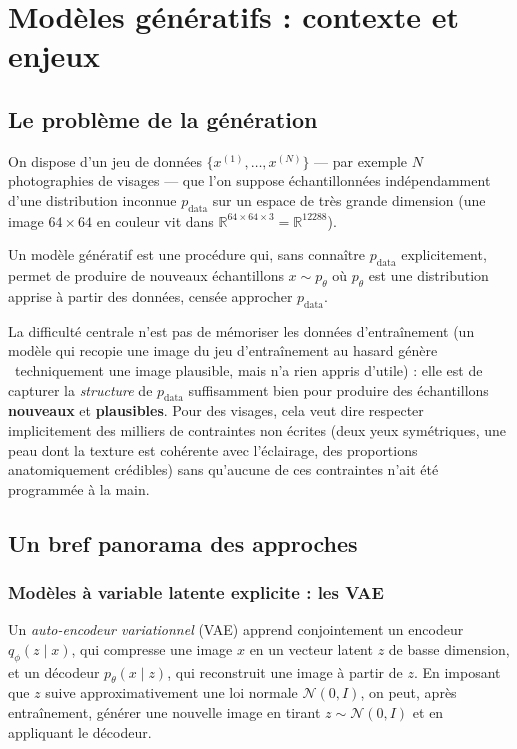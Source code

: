 \chapter{Modèles génératifs : contexte et enjeux}
\label{chap:generative}

\section{Le problème de la génération}

On dispose d'un jeu de données $\{x^{(1)}, \dots, x^{(N)}\}$ — par exemple $N$ photographies de
visages — que l'on suppose échantillonnées indépendamment d'une distribution inconnue $p_{\text{data}}$
sur un espace de très grande dimension (une image $64\times 64$ en couleur vit dans
$\mathbb{R}^{64 \times 64 \times 3} = \mathbb{R}^{12288}$).

\begin{definition}
Un modèle génératif est une procédure qui, sans connaître $p_{\text{data}}$ explicitement, permet de
produire de nouveaux échantillons $x \sim p_\theta$ où $p_\theta$ est une distribution apprise à
partir des données, censée approcher $p_{\text{data}}$.
\end{definition}

La difficulté centrale n'est pas de mémoriser les données d'entraînement (un modèle qui recopie une
image du jeu d'entraînement au hasard \og génère \fg\ techniquement une image plausible, mais n'a rien
appris d'utile) : elle est de capturer la \emph{structure} de $p_{\text{data}}$ suffisamment bien pour
produire des échantillons \textbf{nouveaux} et \textbf{plausibles}. Pour des visages, cela veut dire
respecter implicitement des milliers de contraintes non écrites (deux yeux symétriques, une peau dont
la texture est cohérente avec l'éclairage, des proportions anatomiquement crédibles) sans qu'aucune de
ces contraintes n'ait été programmée à la main.

\section{Un bref panorama des approches}

\subsection{Modèles à variable latente explicite : les VAE}

Un \emph{auto-encodeur variationnel} (VAE) apprend conjointement un encodeur $q_\phi(z \mid x)$, qui
compresse une image $x$ en un vecteur latent $z$ de basse dimension, et un décodeur $p_\theta(x \mid z)$,
qui reconstruit une image à partir de $z$. En imposant que $z$ suive approximativement une loi normale
$\mathcal{N}(0, I)$, on peut, après entraînement, générer une nouvelle image en tirant
$z \sim \mathcal{N}(0, I)$ et en appliquant le décodeur.

